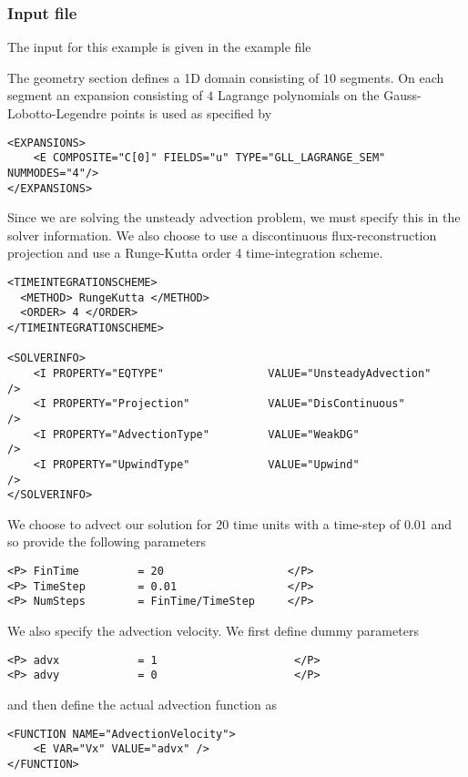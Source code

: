 \subsubsection{Input file}
The input for this example is given in the example file 

The geometry section defines a 1D domain consisting of $10$ segments. On each
segment an expansion consisting of $4$ Lagrange polynomials on the
Gauss-Lobotto-Legendre points is used as specified by
\begin{lstlisting}[style=XMLStyle]
<EXPANSIONS>
    <E COMPOSITE="C[0]" FIELDS="u" TYPE="GLL_LAGRANGE_SEM" NUMMODES="4"/>
</EXPANSIONS>
\end{lstlisting}

Since we are solving the unsteady advection problem, we must specify this in the
solver information. We also choose to use a discontinuous flux-reconstruction
projection and use a Runge-Kutta order 4 time-integration scheme.
\begin{lstlisting}[style=XMLStyle]
<TIMEINTEGRATIONSCHEME>
  <METHOD> RungeKutta </METHOD>
  <ORDER> 4 </ORDER>
</TIMEINTEGRATIONSCHEME>

<SOLVERINFO>
    <I PROPERTY="EQTYPE"                VALUE="UnsteadyAdvection"    />
    <I PROPERTY="Projection"            VALUE="DisContinuous"        />
    <I PROPERTY="AdvectionType"         VALUE="WeakDG"                 />
    <I PROPERTY="UpwindType"            VALUE="Upwind"               />
</SOLVERINFO>
\end{lstlisting}

We choose to advect our solution for $20$ time units with a time-step of $0.01$
and so provide the following parameters
\begin{lstlisting}[style=XMLStyle]
<P> FinTime         = 20                   </P>
<P> TimeStep        = 0.01                 </P>
<P> NumSteps        = FinTime/TimeStep     </P>
\end{lstlisting}

We also specify the advection velocity. We first define dummy parameters
\begin{lstlisting}[style=XMLStyle]
<P> advx            = 1                     </P>
<P> advy            = 0                     </P>
\end{lstlisting}
and then define the actual advection function as
\begin{lstlisting}[style=XMLStyle]
<FUNCTION NAME="AdvectionVelocity">
    <E VAR="Vx" VALUE="advx" />
</FUNCTION>
\end{lstlisting}


